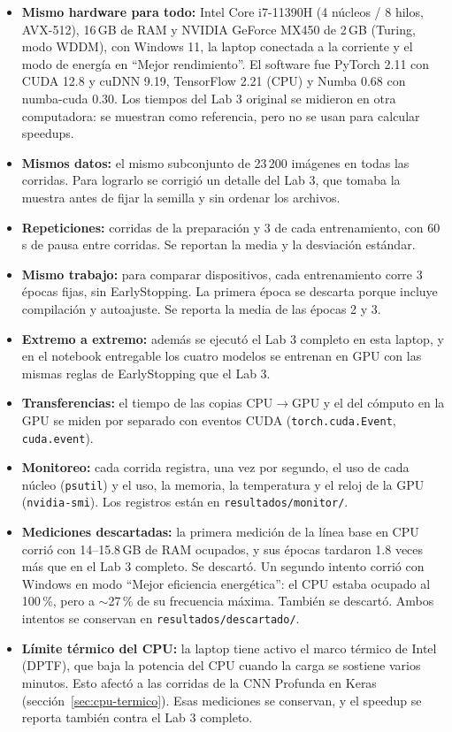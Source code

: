 \documentclass[11pt,letterpaper]{article}
\newcommand{\cod}[1]{\texttt{#1}}
\begin{document}
\begin{itemize}
  \item \textbf{Mismo hardware para todo:} Intel Core i7-11390H (4 núcleos / 8 hilos, AVX-512), 16\,GB de RAM y NVIDIA GeForce MX450 de 2\,GB (Turing, modo WDDM), con Windows 11, la laptop conectada a la corriente y el modo de energía en ``Mejor rendimiento''. El software fue PyTorch 2.11 con CUDA 12.8 y cuDNN 9.19, TensorFlow 2.21 (CPU) y Numba 0.68 con numba-cuda 0.30. Los tiempos del Lab 3 original se midieron en otra computadora: se muestran como referencia, pero no se usan para calcular speedups.
  \item \textbf{Mismos datos:} el mismo subconjunto de 23\,200 imágenes en todas las corridas. Para lograrlo se corrigió un detalle del Lab 3, que tomaba la muestra antes de fijar la semilla y sin ordenar los archivos.
  \item \textbf{Repeticiones:} \PrepReps{} corridas de la preparación y 3 de cada entrenamiento, con 60\,s de pausa entre corridas. Se reportan la media y la desviación estándar.
  \item \textbf{Mismo trabajo:} para comparar dispositivos, cada entrenamiento corre 3 épocas fijas, sin EarlyStopping. La primera época se descarta porque incluye compilación y autoajuste. Se reporta la media de las épocas 2 y 3.
  \item \textbf{Extremo a extremo:} además se ejecutó el Lab 3 completo en esta laptop, y en el notebook entregable los cuatro modelos se entrenan en GPU con las mismas reglas de EarlyStopping que el Lab 3.
  \item \textbf{Transferencias:} el tiempo de las copias CPU$\rightarrow$GPU y el del cómputo en la GPU se miden por separado con eventos CUDA (\cod{torch.cuda.Event}, \cod{cuda.event}).
  \item \textbf{Monitoreo:} cada corrida registra, una vez por segundo, el uso de cada núcleo (\cod{psutil}) y el uso, la memoria, la temperatura y el reloj de la GPU (\cod{nvidia-smi}). Los registros están en \cod{resultados/monitor/}.
  \item \textbf{Mediciones descartadas:} la primera medición de la línea base en CPU corrió con 14--15.8\,GB de RAM ocupados, y sus épocas tardaron 1.8 veces más que en el Lab 3 completo. Se descartó. Un segundo intento corrió con Windows en modo ``Mejor eficiencia energética'': el CPU estaba ocupado al 100\,\%, pero a $\sim$27\,\% de su frecuencia máxima. También se descartó. Ambos intentos se conservan en \cod{resultados/descartado/}.
  \item \textbf{Límite térmico del CPU:} la laptop tiene activo el marco térmico de Intel (DPTF), que baja la potencia del CPU cuando la carga se sostiene varios minutos. Esto afectó a las corridas de la CNN Profunda en Keras (sección~\ref{sec:cpu-termico}). Esas mediciones se conservan, y el speedup se reporta también contra el Lab 3 completo.
\end{itemize}
\end{document}
